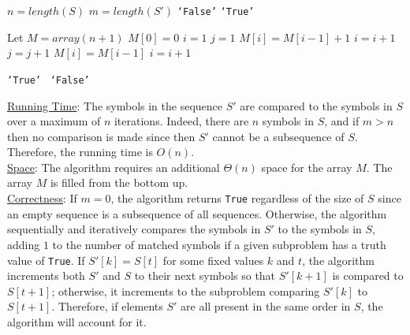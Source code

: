 \documentclass[twoside,11pt]{homework}
\newcommand\NoProc{\renewcommand\algorithmicprocedure{}}
\begin{document}
\begin{algorithm}
\begin{algorithmic}[1]
\NoProc
{}  
\State $n = length(S)$
\State $m = length(S')$
\State \Return \texttt{`False'}
\EndIf
{}
\State \Return \texttt{`True'}
\EndIf


\State Let $M = array(n+1)$ 
\State $M[0] = 0$
\State $i = 1$
\State $j = 1$
\State $M[i] = M[i-1] + 1$
\State $i = i + 1$
\State $j = j + 1$
\State $M[i] = M[i-1]$
\State $i = i + 1$  
\EndIf
\EndWhile

\State \Return \texttt{`True'}
\Else \ \Return \texttt{`False'}
\EndIf
\EndProcedure
\end{algorithmic}
\end{algorithm}



\noindent
\underline{Running Time}:  The symbols in the sequence $S'$ are compared to the symbols in $S$ over a maximum of $n$ iterations. Indeed, there are $n$ symbols in $S$, and if $m > n$ then no comparison is made since then $S'$ cannot be a subsequence of $S$.  Therefore, the running time is $O(n)$. \\


\noindent
\underline{Space}:  The algorithm requires an additional $\Theta(n)$ space for the array $M$.   The array $M$ is filled from the bottom up. \\

\noindent
\underline{Correctness}:  If $m = 0$,  the algorithm returns \texttt{True} regardless of the size of $S$ since an empty sequence is a subsequence of all sequences. 
Otherwise,  the algorithm sequentially and iteratively compares the symbols in $S'$ to the symbols in $S$, adding $1$ to the number of matched symbols if a given subproblem has a truth value of \texttt{True}.  If $S'[k] = S[t]$ for some fixed values $k$ and $t$, the algorithm increments both $S'$ and $S$ to their next symbols so that $S'[k+1]$ is compared to $S[t+1]$; otherwise,  it increments to the subproblem comparing $S'[k]$ to $S[t+1]$.  Therefore, if elements $S'$ are all present in the same order in $S$, the algorithm will account for it.  
\end{document}
